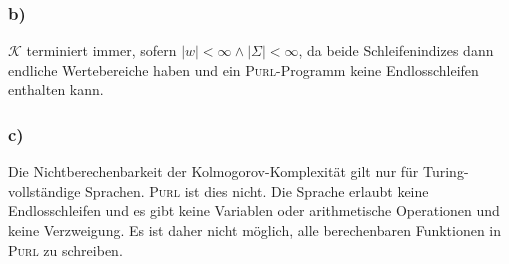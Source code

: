 \documentclass{article}
\begin{document}
\subsubsection{b)}

$\mathcal{K}$ terminiert immer, sofern $|w|<\infty \wedge |\Sigma| < \infty$, da
beide Schleifenindizes dann endliche Wertebereiche haben und ein
\textsc{Purl}-Programm keine Endlosschleifen enthalten kann.

\subsubsection{c)}

Die Nichtberechenbarkeit der Kolmogorov-Komplexität gilt nur für
Turing-vollständige Sprachen. \textsc{Purl} ist dies nicht. Die Sprache erlaubt
keine Endlosschleifen und es gibt keine Variablen oder arithmetische Operationen
und keine Verzweigung. Es ist daher nicht möglich, alle berechenbaren Funktionen
in \textsc{Purl} zu schreiben.  
\end{document}
